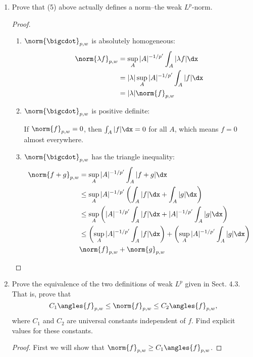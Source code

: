 \documentclass[12pt,letterpaper]{article}
\begin{document}

\begin{enumerate}
\item Prove that (5) above actually defines a norm--the weak $L^p$-norm.
\begin{proof}
\begin{enumerate}
\item $\norm{\bigcdot}_{p,w}$ is absolutely homogeneous:
	\begin{align*}
	\norm{\lambda f}_{p,w}
	&=\sup_A |A|^{-1/p'} \int_A |\lambda f| \dx \\
	&=|\lambda|\sup_A |A|^{-1/p'} \int_A |f| \dx \\
	&=|\lambda|\norm{ f}_{p,w}
	\end{align*}
	
\item $\norm{\bigcdot}_{p,w}$ is positive definite:

If $\norm{f}_{p,w}=0$, then $\int_A|f|\dx=0$ for all $A$, which means $f=0$ almost everywhere. 

\item $\norm{\bigcdot}_{p,w}$ has the triangle inequality:
	\begin{align*}
	\norm{f+g}_{p,w}
	&=\sup_A |A|^{-1/p'} \int_A | f + g| \dx \\
	&\leq \sup_A |A|^{-1/p'} \left(\int_A | f | \dx + \int_A |  g| \dx \right)\\
	&\leq \sup_A \left(|A|^{-1/p'} \int_A |f| \dx + |A|^{-1/p'} \int_A |g| \dx\right) \\
	&\leq \left(\sup_A |A|^{-1/p'} \int_A |f| \dx\right) + \left(\sup_A |A|^{-1/p'} \int_A |g| \dx\right) \\
	&\norm{f}_{p,w}+\norm{g}_{p,w}\qedhere
	\end{align*}
\end{enumerate}
\end{proof}

\item Prove the equivalence of the two definitions of weak $L^p$ given in Sect. 4.3. That is, %
prove that 
$$C_1\angles{f}_{p,w}\leq \norm{f}_{p,w}\leq C_2\angles{f}_{p,w},$$
where $C_1$ and $C_2$ are universal constants independent of $f$. Find explicit values for these constants.

\begin{proof}
First we will show that $\norm{f}_{p,w}\geq C_1\angles{f}_{p,w}$. 


\end{proof}
\end{enumerate}
\end{document}
